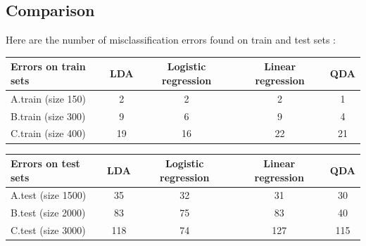 \documentclass[11pt,a4paper]{article}
\begin{document}
\subsection{Comparison}
%
\hspace*{-6mm}Here are the number of misclassification errors found on train and test sets :

\begin{tabular}{|l|c|c|c|c|}
  \hline
  Errors on train sets & LDA & Logistic regression & Linear regression & QDA \\
  \hline
  A.train (size 150) & 2 & 2 & 2 & 1 \\
  B.train (size 300) & 9 & 6 & 9 & 4 \\
	C.train (size 400) & 19 & 16 & 22 & 21 \\
  \hline
\end{tabular}

\begin{tabular}{|l|c|c|c|c|}
  \hline
  Errors on test sets & LDA & Logistic regression & Linear regression & QDA \\
  \hline
  A.test (size 1500) & 35 & 32 & 31 & 30 \\
  B.test (size 2000) & 83 & 75 & 83 & 40 \\
	C.test (size 3000) & 118 & 74 & 127 & 115 \\
  \hline
\end{tabular}
\end{document}
